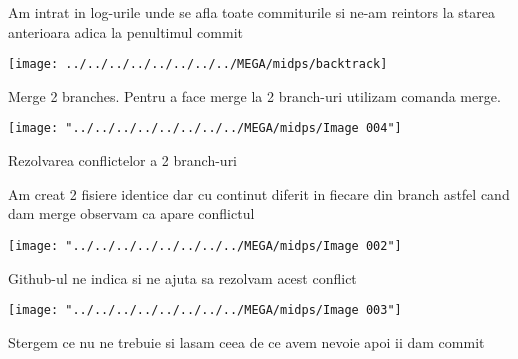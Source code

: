Am intrat in log-urile  unde se afla toate commiturile si ne-am reintors la starea anterioara adica la penultimul commit
\begin{center}
\texttt{[image: ../../../../../../../../MEGA/midps/backtrack]}
\end{center}




Merge 2 branches.
Pentru a face merge la 2 branch-uri utilizam comanda merge.
\begin{center}
\texttt{[image: "../../../../../../../../MEGA/midps/Image 004"]}
\end{center}

Rezolvarea conflictelor a 2 branch-uri

Am creat 2 fisiere identice dar cu continut diferit in fiecare din branch astfel cand dam merge observam ca apare conflictul
\begin{center}
\texttt{[image: "../../../../../../../../MEGA/midps/Image 002"]}
\end{center}
Github-ul ne indica si ne ajuta sa rezolvam acest conflict
\begin{center}
\texttt{[image: "../../../../../../../../MEGA/midps/Image 003"]}
\end{center}
Stergem ce nu ne trebuie si lasam ceea de ce avem nevoie apoi ii dam commit


\clearpage
